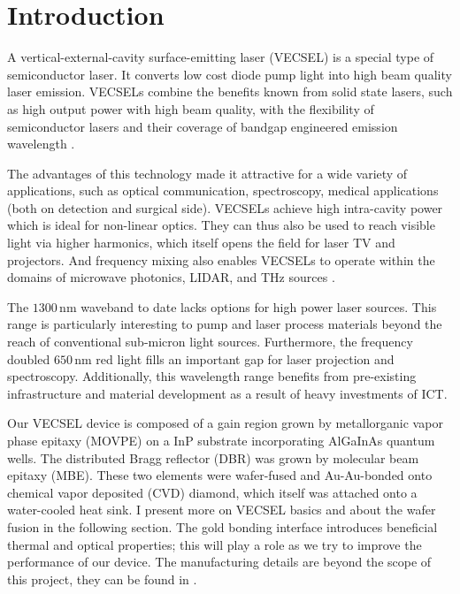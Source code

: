 \section{Introduction}
\label{sec:intro}

A vertical-external-cavity
surface-emitting laser
(VECSEL)
is a special type
of semiconductor laser.
It converts
low cost diode pump light
into high beam quality
laser emission.
VECSELs combine
the benefits known from
solid state lasers,
such as high output power
with high beam quality,
with the flexibility
of semiconductor lasers
and their coverage
of bandgap engineered
emission wavelength
\cite{Tropper2006,Ranta2014OptLett,Kemp2008,Chernikov2010}.

The advantages of this technology
made it attractive for a
wide variety of applications,
such as
optical communication,
spectroscopy,
medical applications
(both on detection and surgical side).
VECSELs achieve
high intra-cavity power
which is ideal
for non-linear optics.
They can thus also be used
to reach visible light
via higher harmonics,
which itself opens the field for
laser TV and projectors.
And frequency mixing
also enables VECSELs
to operate within the domains of
microwave photonics,
LIDAR, and THz sources 
\cite{Ranta2014OptLett,Calvez2009,Sirbu2014OptExp,Baili2009,Lukowski2015,Bedford2005}.

The $1300\,\mathrm{nm}$ waveband
to date lacks options
for high power laser sources.
This range is particularly interesting
\cite{Ranta2014OptLett,Sirbu2014OptExp}
to pump and laser process
materials
beyond the reach
of conventional
sub-micron light sources.
Furthermore,
the frequency doubled
$650\,\mathrm{nm}$
red light
fills an important gap
for laser projection
and spectroscopy.
Additionally,
this wavelength range
benefits from
pre-existing infrastructure
and material development
as a result of
heavy investments of ICT.

Our VECSEL device
is composed of
a gain region
grown by metallorganic vapor phase epitaxy
(MOVPE)
on a InP substrate
incorporating
AlGaInAs quantum wells.
The distributed Bragg reflector (DBR)
was grown by molecular beam epitaxy (MBE).
These two elements were wafer-fused
and Au-Au-bonded
onto chemical vapor deposited (CVD) diamond,
which itself was attached
onto a water-cooled heat sink.
I present
more on VECSEL basics
and about the wafer fusion
in the following section.
The gold bonding interface
introduces beneficial
thermal and optical properties;
this will play a role
as we try to improve
the performance of our device.
The manufacturing details
are beyond the scope of this project,
they can be found in
\cite{Ranta2014OptLett,Sirbu2014SPIE}.

